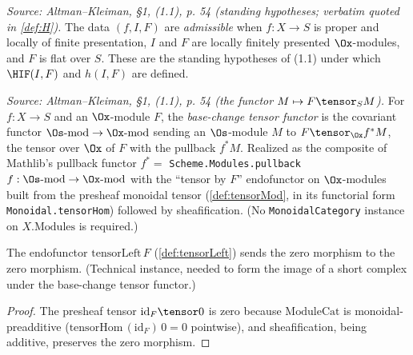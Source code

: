 \begin{definition}
  \label{def:admissible}
  \textit{Source: Altman--Kleiman, §1, (1.1), p. 54 (standing hypotheses; verbatim quoted in \cref{def:H}).}
  The data $(f, I, F)$ are \emph{admissible} when $f : X \to S$ is proper and
  locally of finite presentation, $I$ and $F$ are locally finitely presented
  $\Ox$-modules, and $F$ is flat over $S$. These are the standing hypotheses of
  (1.1) under which $\HIF(I,F)$ and $h(I,F)$ are defined.
\end{definition}

\begin{definition}

  \label{def:tensorBaseChangeFunctor}
  \textit{Source: Altman--Kleiman, §1, (1.1), p. 54 (the functor $M \mapsto F \tensor_S M$).}
  For $f : X \to S$ and an $\Ox$-module $F$, the \emph{base-change tensor functor}
  is the covariant functor $\Os\text{-mod} \to \Ox\text{-mod}$ sending an
  $\Os$-module $M$ to $F \tensor_{\Ox} f^* M$, the tensor over $\Ox$ of $F$ with
  the pullback $f^* M$. Realized as the composite of Mathlib's pullback functor
  $f^* = $ \texttt{Scheme.Modules.pullback}\,$f : \Os\text{-mod} \to \Ox\text{-mod}$
  with the ``tensor by $F$'' endofunctor on $\Ox$-modules built from the presheaf
  monoidal tensor (\cref{def:tensorMod}, in its functorial form
  \texttt{Monoidal.tensorHom}) followed by sheafification. (No
  \texttt{MonoidalCategory} instance on $X.\mathrm{Modules}$ is required.)
\end{definition}

\begin{lemma}
  \label{lem:tensorLeft_preservesZeroMorphisms}
  The endofunctor $\mathrm{tensorLeft}\,F$ (\cref{def:tensorLeft}) sends the zero
  morphism to the zero morphism. (Technical instance, needed to form the image of
  a short complex under the base-change tensor functor.)
  \begin{proof}
    The presheaf tensor $\mathrm{id}_F \tensor 0$ is zero because $\mathrm{ModuleCat}$
    is monoidal-preadditive ($\mathrm{tensorHom}\,(\mathrm{id}_F)\,0 = 0$ pointwise),
    and sheafification, being additive, preserves the zero morphism.
  \end{proof}
\end{lemma}

